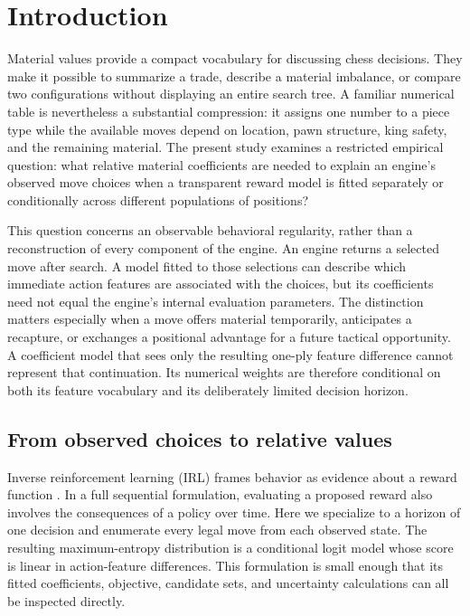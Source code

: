 \section{Introduction}
Material values provide a compact vocabulary for discussing chess decisions. They make it possible to summarize a trade, describe a material imbalance, or compare two configurations without displaying an entire search tree. A familiar numerical table is nevertheless a substantial compression: it assigns one number to a piece type while the available moves depend on location, pawn structure, king safety, and the remaining material. The present study examines a restricted empirical question: what relative material coefficients are needed to explain an engine's observed move choices when a transparent reward model is fitted separately or conditionally across different populations of positions?

This question concerns an observable behavioral regularity, rather than a reconstruction of every component of the engine. An engine returns a selected move after search. A model fitted to those selections can describe which immediate action features are associated with the choices, but its coefficients need not equal the engine's internal evaluation parameters. The distinction matters especially when a move offers material temporarily, anticipates a recapture, or exchanges a positional advantage for a future tactical opportunity. A coefficient model that sees only the resulting one-ply feature difference cannot represent that continuation. Its numerical weights are therefore conditional on both its feature vocabulary and its deliberately limited decision horizon.

\subsection{From observed choices to relative values}
Inverse reinforcement learning (IRL) frames behavior as evidence about a reward function \cite{ng2000,ziebart}. In a full sequential formulation, evaluating a proposed reward also involves the consequences of a policy over time. Here we specialize to a horizon of one decision and enumerate every legal move from each observed state. The resulting maximum-entropy distribution is a conditional logit model whose score is linear in action-feature differences. This formulation is small enough that its fitted coefficients, objective, candidate sets, and uncertainty calculations can all be inspected directly.

